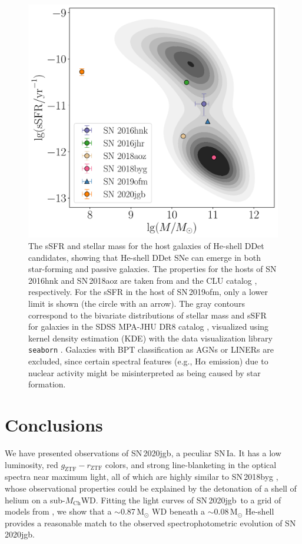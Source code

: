 \documentclass[twocolumn]{aastex631}
\newcommand{\sn}{SN\,2020jgb}
\newcommand{\Mch}{$M_\mathrm{Ch}$}
\begin{document}
\begin{figure}
    \centering
    \includegraphics[width=\linewidth]{host.pdf}
    \caption{The sSFR and stellar mass for the host galaxies of He-shell DDet candidates, showing that He-shell DDet SNe can emerge in both star-forming and passive galaxies. The properties for the hosts of SN\,2016hnk and SN\,2018aoz are taken from \citet{Dong_Ca-rich_2022} and the CLU catalog \citep{de_Ca_rich_2020}, respectively. For the sSFR in the host of SN\,2019ofm, only a lower limit is shown (the circle with an arrow). The gray contours correspond to the bivariate distributions of stellar mass and sSFR for galaxies in the SDSS MPA-JHU DR8 catalog \citep{Kauffmann_SDSS_2003,Brinchmann_SDSS_2004}, visualized using kernel density estimation (KDE) with the data visualization library \texttt{seaborn} \citep{Waskom_seaborn_2021}. Galaxies with BPT classification as AGNs or LINERs are excluded, since certain spectral features (e.g., H$\alpha$ emission) due to nuclear activity might be misinterpreted as being caused by star formation.}
    \label{fig:host}
\end{figure}

\section{Conclusions} \label{sec:conclusion}
We have presented observations of \sn, a peculiar SN\,Ia. It has a low luminosity, red $g_\mathrm{ZTF}-r_\mathrm{ZTF}$ colors, and strong line-blanketing in the optical spectra near maximum light, all of which are highly similar to SN\,2018byg \citep{de_18byg_2019}, whose observational properties could be explained by the detonation of a shell of helium on a sub-\Mch WD. Fitting the light curves of \sn\ to a grid of models from \citet{polin_observational_2019}, we show that a $\sim$0.87\,$\mathrm{M_\odot}$ WD beneath a $\sim$0.08\,$\mathrm{M_\odot}$ He-shell provides a reasonable match to the observed spectrophotometric evolution of \sn.
\end{document}
